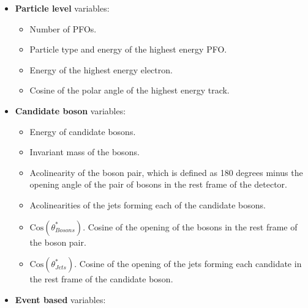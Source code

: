 \begin{itemize}
\item \textbf{Particle level} variables:

\begin{itemize}
\item Number of PFOs.
\item Particle type and energy of the highest energy PFO.
\item Energy of the highest energy electron.
\item Cosine of the polar angle of the highest energy track.
\end{itemize}

\item \textbf{Candidate boson} variables:

\begin{itemize}
\item Energy of candidate bosons.
\item Invariant mass of the bosons.
\item Acolinearity of the boson pair, which is defined as 180 degrees minus the opening angle of the pair of bosons in the rest frame of the detector.
\item Acolinearities of the jets forming each of the candidate bosons.
\item $\text{Cos}(\theta^{*}_{Bosons})$.  Cosine of the opening of the bosons in the rest frame of the boson pair.
\item $\text{Cos}(\theta^{*}_{Jets})$.  Cosine of the opening of the jets forming each candidate in the rest frame of the candidate boson.
\end{itemize}

\item \textbf{Event based} variables:  


\end{itemize}
